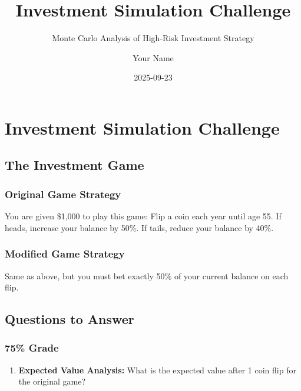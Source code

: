 \documentclass[
  letterpaper,
  DIV=11,
  numbers=noendperiod]{scrartcl}
\title{Investment Simulation Challenge}
\subtitle{Monte Carlo Analysis of High-Risk Investment Strategy}
\author{Your Name}
\date{2025-09-23}
\providecommand{\tightlist}{%
  \setlength{\itemsep}{0pt}\setlength{\parskip}{0pt}}
\begin{document}
\maketitle


\section{Investment Simulation
Challenge}\label{investment-simulation-challenge}

\subsection{The Investment Game}\label{the-investment-game}

\subsubsection{Original Game Strategy}\label{original-game-strategy}

You are given \$1,000 to play this game: Flip a coin each year until age
55. If heads, increase your balance by 50\%. If tails, reduce your
balance by 40\%.

\subsubsection{Modified Game Strategy}\label{modified-game-strategy}

Same as above, but you must bet exactly 50\% of your current balance on
each flip.

\subsection{Questions to Answer}\label{questions-to-answer}

\subsubsection{75\% Grade}\label{grade}

\begin{enumerate}
\def\labelenumi{\arabic{enumi}.}
\tightlist
\item
  \textbf{Expected Value Analysis:} What is the expected value after 1
  coin flip for the original game?
\end{enumerate}
\end{document}
